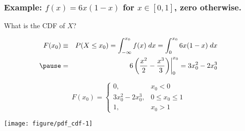 \begin{frame}
  \frametitle{Example: $f(x) = 6x(1-x)$ for $x \in [0,1]$, zero otherwise.}

  \begin{block}{What is the CDF of $X$?}

    \begin{eqnarray*}
      F(x_0) &\equiv& P(X \leq x_0) = \int_{-\infty}^{x_0} f(x)\; dx = \int_{0}^{x_0} 6x(1-x) \; dx\\  \pause
      &=& \left. 6\left( \frac{x^2}{2} - \frac{x^3}{3} \right)\right|_0^{x_0} = 3x_0^2 - 2x_0^3 
    \end{eqnarray*}

    \pause
  
  \[
    F(x_0) = \left\{
    \begin{array}{lr}
      0, & x_0 < 0\\
      3x_0^2 - 2x_0^3, & 0 \leq x_0 \leq 1\\
      1, & x_0 > 1
    \end{array}
    \right.
  \]

\end{block}



\end{frame}
\begin{frame}[fragile]
\begin{knitrout}
\color{fgcolor}\begin{kframe}
\begin{alltt}
\hlstd{(} \hlstd{=} \hlstd{(}\hlstd{,}\hlstd{))}
\hlstd{(} \hlopt{*}  \hlopt{*} \hlstd{(} \hlopt{-}   \hlstd{=} \hlstd{,}  \hlstd{=} \hlstd{,}  \hlstd{=} \hlstd{)}
\hlstd{(} \hlopt{*} \hlopt{^} \hlopt{-}  \hlopt{*} \hlopt{^}\hlstd{,}  \hlstd{=} \hlstd{,}  \hlstd{=} \hlstd{,}  \hlstd{=} \hlstd{)}
\end{alltt}
\end{kframe}
\texttt{[image: figure/pdf\_cdf-1]} 
\begin{kframe}\begin{alltt}
\hlstd{(} \hlstd{=} \hlstd{(}\hlstd{,}\hlstd{))}
\end{alltt}
\end{kframe}
\end{knitrout}

\end{frame}
